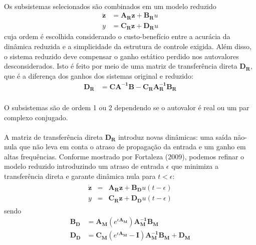 \documentclass[a4paper,11pt]{scrartcl} %
\numberwithin{equation}{section} %
\numberwithin{figure}{section} %
\numberwithin{table}{section} %
\begin{document}
\paragraph{} Os subsistemas selecionados são combinados em um modelo reduzido \begin{align}
	\mathbf{\dot{z}} &= \mathbf{A_R}\mathbf{z}+\mathbf{B_R}u\\
	y &= \mathbf{C_R}\mathbf{z}+\mathbf{D_R}u
\end{align} cuja ordem é escolhida considerando o custo-benefício entre a acurácia da dinâmica reduzida e a simplicidade da estrutura de controle exigida. Além disso, o sistema reduzido deve compensar o ganho estático perdido nos autovalores desconsiderados. Isto é feito por meio de uma matriz de transferência direta $\mathbf{D_R}$, que é a diferença dos ganhos dos sistemas original e reduzido: \begin{align}
	\mathbf{D_R}&=\mathbf{C}\mathbf{A^{-1}}\mathbf{B}-\mathbf{C_R}\mathbf{A_R^{-1}}\mathbf{B_R}
\end{align}

\paragraph{} O subsistemas são de ordem 1 ou 2 dependendo se o autovalor é real ou um par complexo conjugado. %

\paragraph{} A matriz de transferência direta $\mathbf{D_R}$ introduz novas dinâmicas: uma saída não-nula que não leva em conta o atraso de propagação da entrada e um ganho em altas frequências. Conforme mostrado por Fortaleza (2009), podemos refinar o modelo reduzido introduzindo um atraso de entrada $\epsilon$ que minimiza a transferência direta e garante dinâmica nula para $t < \epsilon$: \begin{align}
\begin{array}{lll}
	\mathbf{\dot{z}} &=& \mathbf{A_R}\mathbf{z}+\mathbf{B_D}u(t-\epsilon)\\
	y &=& \mathbf{C_R}\mathbf{z}+\mathbf{D_D}u(t-\epsilon) \label{novoModeloReduzido}
\end{array}
\end{align} sendo \begin{align}
	\mathbf{B_D} &= \mathbf{A_M}\left(e^{\epsilon\mathbf{A_M}}\right)\mathbf{A_M^{-1}}\mathbf{B_M}\\
	\mathbf{D_D} &= \mathbf{C_M}\left(e^{\epsilon\mathbf{A_M}} - \mathbf{I}\right)\mathbf{A_M^{-1}}\mathbf{B_M} + \mathbf{D_M}
\end{align}
\end{document}
